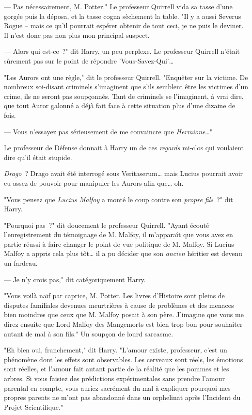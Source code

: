 --- Pas nécessairement, M. Potter." Le professeur Quirrell vida sa tasse d'une gorgée puis la déposa, et la tasse cogna sèchement la table. "Il y a aussi Severus Rogue -- mais ce qu'il pourrait espérer obtenir de tout ceci, je ne puis le deviner. Il n'est donc pas non plus mon principal suspect.

--- Alors qui est-ce~?" dit Harry, un peu perplexe. Le professeur Quirrell n'était sûrement pas sur le point de répondre 'Vous-Savez-Qui'…

"Les Aurors ont une règle," dit le professeur Quirrell. "Enquêter sur la victime. De nombreux soi-disant criminels s'imaginent que s'ils semblent être les victimes d'un crime, ils ne seront pas soupçonnés. Tant de criminels se l'imaginent, à vrai dire, que tout Auror galonné a déjà fait face à cette situation plus d'une dizaine de fois.

--- Vous n'essayez pas sérieusement de me convaincre que \emph{Hermione}…"

Le professeur de Défense donnait à Harry un de ces \emph{regards} mi-clos qui voulaient dire qu'il était stupide.

\emph{Drago}~? Drago avait été interrogé sous Veritaserum… mais Lucius pourrait avoir eu assez de pouvoir pour manipuler les Aurors afin que… oh.

"Vous pensez que \emph{Lucius Malfoy} a monté le coup contre son \emph{propre fils}~?" dit Harry.

"Pourquoi pas~?" dit doucement le professeur Quirrell. "Ayant écouté l'enregistrement du témoignage de M. Malfoy, il m'apparaît que vous avez en partie réussi à faire changer le point de vue politique de M. Malfoy. Si Lucius Malfoy a appris cela plus tôt… il a pu décider que son \emph{ancien} héritier est devenu un fardeau.

--- Je n'y crois pas," dit catégoriquement Harry.

"Vous voilà naïf par caprice, M. Potter. Les livres d'Histoire sont pleins de disputes familiales devenues meurtrières à cause de problèmes et des menaces bien moindres que ceux que M. Malfoy posait à son père. J'imagine que vous me direz ensuite que Lord Malfoy des Mangemorts est bien trop bon pour souhaiter autant de mal à son fils." Un soupçon de lourd sarcasme.

"Eh bien oui, franchement," dit Harry. "L'amour existe, professeur, c'est un phénomène dont les effets sont observables. Les cerveaux sont réels, les émotions sont réelles, et l'amour fait autant partie de la réalité que les pommes et les arbres. Si vous faisiez des prédictions expérimentales sans prendre l'amour parental en compte, vous auriez sacrément du mal à expliquer pourquoi mes propres parents ne m'ont pas abandonné dans un orphelinat après l'Incident du Projet Scientifique."

